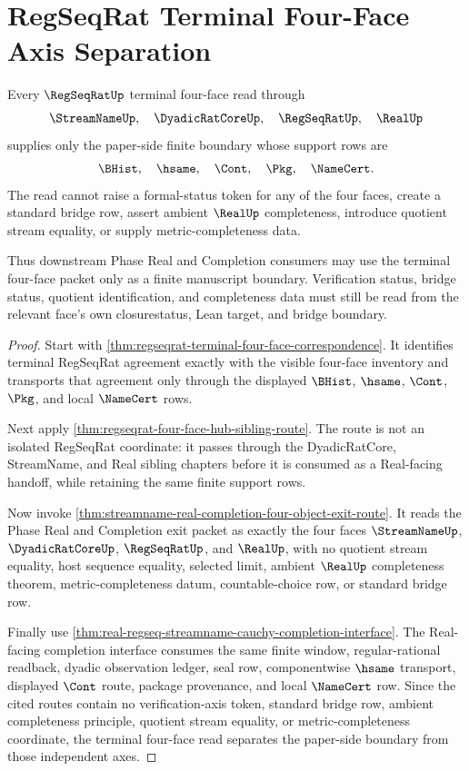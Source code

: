 \section{RegSeqRat Terminal Four-Face Axis Separation}
\label{sec:regseqrat-terminal-four-face-axis-separation}

\begin{theorem}
\label{thm:regseqrat-terminal-four-face-axis-separation}
Every $\RegSeqRatUp$ terminal four-face read through
$$
\StreamNameUp,\quad \DyadicRatCoreUp,\quad \RegSeqRatUp,\quad \RealUp
$$
supplies only the paper-side finite boundary whose support rows are
$$
\BHist,\quad \hsame,\quad \Cont,\quad \Pkg,\quad \NameCert.
$$
The read cannot raise a formal-status token for any of the four faces, create
a standard bridge row, assert ambient $\RealUp$ completeness, introduce
quotient stream equality, or supply metric-completeness data.

Thus downstream Phase Real and Completion consumers may use the terminal
four-face packet only as a finite manuscript boundary. Verification status,
bridge status, quotient identification, and completeness data must still be
read from the relevant face's own closurestatus, Lean target, and bridge
boundary.
\end{theorem}
\begin{proof}
Start with \autoref{thm:regseqrat-terminal-four-face-correspondence}. It
identifies terminal RegSeqRat agreement exactly with the visible four-face
inventory and transports that agreement only through the displayed $\BHist$,
$\hsame$, $\Cont$, $\Pkg$, and local $\NameCert$ rows.

Next apply \autoref{thm:regseqrat-four-face-hub-sibling-route}. The route is
not an isolated RegSeqRat coordinate: it passes through the DyadicRatCore,
StreamName, and Real sibling chapters before it is consumed as a Real-facing
handoff, while retaining the same finite support rows.

Now invoke \autoref{thm:streamname-real-completion-four-object-exit-route}.
It reads the Phase Real and Completion exit packet as exactly the four faces
$\StreamNameUp$, $\DyadicRatCoreUp$, $\RegSeqRatUp$, and $\RealUp$, with no
quotient stream equality, host sequence equality, selected limit, ambient
$\RealUp$ completeness theorem, metric-completeness datum, countable-choice
row, or standard bridge row.

Finally use \autoref{thm:real-regseq-streamname-cauchy-completion-interface}.
The Real-facing completion interface consumes the same finite window,
regular-rational readback, dyadic observation ledger, seal row, componentwise
$\hsame$ transport, displayed $\Cont$ route, package provenance, and local
$\NameCert$ row. Since the cited routes contain no verification-axis token,
standard bridge row, ambient completeness principle, quotient stream
equality, or metric-completeness coordinate, the terminal four-face read
separates the paper-side boundary from those independent axes.
\end{proof}
